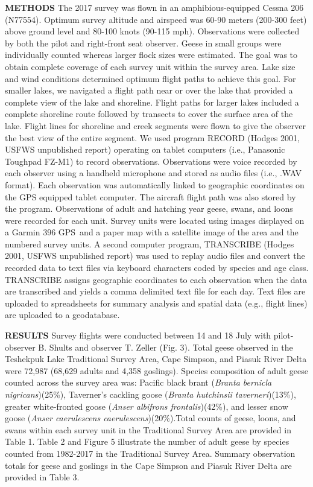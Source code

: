\documentclass[]{article}
\begin{document}
\textbf{METHODS}\break
The 2017 survey was flown in an amphibious-equipped Cessna 206 (N77554).
Optimum survey altitude and airspeed was 60-90 meters (200-300 feet)
above ground level and 80-100 knots (90-115 mph). Observations were
collected by both the pilot and right-front seat observer. Geese in
small groups were individually counted whereas larger flock sizes were
estimated. The goal was to obtain complete coverage of each survey unit
within the survey area. Lake size and wind conditions determined optimum
flight paths to achieve this goal. For smaller lakes, we navigated a
flight path near or over the lake that provided a complete view of the
lake and shoreline. Flight paths for larger lakes included a complete
shoreline route followed by transects to cover the surface area of the
lake. Flight lines for shoreline and creek segments were flown to give
the observer the best view of the entire segment. We used program RECORD
(Hodges 2001, USFWS unpublished report) operating on tablet computers
(i.e., Panasonic Toughpad FZ-M1\texttrademark) to record observations.
Observations were voice recorded by each observer using a handheld
microphone and stored as audio files (i.e., .WAV format). Each
observation was automatically linked to geographic coordinates on the
GPS equipped tablet computer. The aircraft flight path was also stored
by the program. Observations of adult and hatching year geese, swans,
and loons were recorded for each unit. Survey units were located using
images displayed on a Garmin 396 GPS\texttrademark~and a paper map with
a satellite image of the area and the numbered survey units. A second
computer program, TRANSCRIBE (Hodges 2001, USFWS unpublished report) was
used to replay audio files and convert the recorded data to text files
via keyboard characters coded by species and age class. TRANSCRIBE
assigns geographic coordinates to each observation when the data are
transcribed and yields a comma delimited text file for each day. Text
files are uploaded to spreadsheets for summary analysis and spatial data
(e.g., flight lines) are uploaded to a geodatabase.

\setlength{\parskip}{4ex} \textbf{RESULTS}\newline
Survey flights were conducted between 14 and 18 July with pilot-observer
B. Shults and observer T. Zeller (Fig. 3). Total geese observed in the
Teshekpuk Lake Traditional Survey Area, Cape Simpson, and Piasuk River
Delta were 72,987 (68,629 adults and 4,358 goslings). Species
composition of adult geese counted across the survey area was: Pacific
black brant (\textit{Branta bernicla nigricans})(25\%), Taverner's
cackling goose (\textit{Branta hutchinsii taverneri})(13\%), greater
white-fronted goose (\textit{Anser albifrons frontalis})(42\%), and
lesser snow goose (\textit{Anser caerulescens caerulescens})(20\%).Total
counts of geese, loons, and swans within each survey unit in the
Traditional Survey Area are provided in Table 1. Table 2 and Figure 5
illustrate the number of adult geese by species counted from 1982-2017
in the Traditional Survey Area. Summary observation totals for geese and
goslings in the Cape Simpson and Piasuk River Delta are provided in
Table 3.
\end{document}

